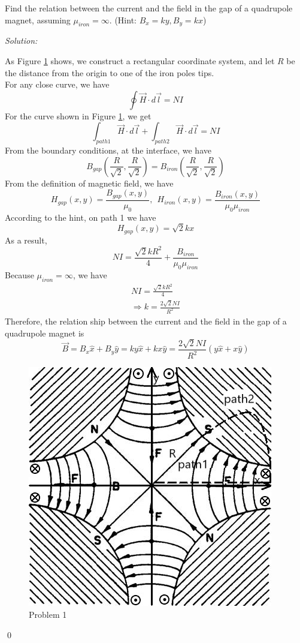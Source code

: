 \documentclass[12pt]{article}
\newenvironment{problem}[2][Problem]{\begin{trivlist}
\item[\hskip \labelsep {\bfseries #1}\hskip \labelsep {\bfseries #2.}]}{\end{trivlist}}
\newenvironment{sol}
    {\emph{Solution:}
    }
    {
    \qed
    }
\begin{document}
\begin{problem}{1}
Find the relation between the current and the field in the gap of a quadrupole magnet, assuming $\mu_{iron}=\infty$. (Hint: $B_x=ky, B_y=kx$)
\end{problem}
\begin{sol}
As Figure \ref{Problem1} shows, we construct a rectangular coordinate system, and let $R$ be the distance from the origin to one of the iron poles tips.\\
For any close curve, we have
\[
\oint\vec{H}\cdot d\vec{l}=NI
\]
For the curve shown in Figure \ref{Problem1}, we get
\[
\int_{path1}\vec{H}\cdot d\vec{l}+\int_{path2}\vec{H}\cdot d\vec{l}=NI
\]
From the boundary conditions, at the interface, we have
\[
B_{gap}(\frac{R}{\sqrt{2}},\frac{R}{\sqrt{2}})=B_{iron}(\frac{R}{\sqrt{2}},\frac{R}{\sqrt{2}})
\]
From the definition of magnetic field, we have
\[
H_{gap}(x,y)=\frac{B_{gap}(x,y)}{\mu_0},~~H_{iron}(x,y)=\frac{B_{iron}(x,y)}{\mu_0\mu_{iron}}
\]
According to the hint, on path 1 we have
\[
H_{gap}(x,y)=\sqrt{2}kx
\]
As a result,
\[
NI=\frac{\sqrt{2}kR^2}{4}+\frac{B_{iron}}{\mu_0\mu_{iron}}
\]
Because $\mu_{iron}=\infty$, we have
\begin{gather*}
NI=\frac{\sqrt{2}kR^2}{4}\\
\Longrightarrow k=\frac{2\sqrt{2}NI}{R^2}
\end{gather*}
Therefore, the relation ship between the current and the field in the gap of a quadrupole magnet is
\[
\vec{B}=B_x\hat{x}+B_y\hat{y}=ky\hat{x}+kx\hat{y}=\frac{2\sqrt{2}NI}{R^2}(y\hat{x}+x\hat{y})
\]
\begin{figure}[h]
\centering
\includegraphics[scale=.7]{Homework_3Problem_1.jpg}
\caption{Problem 1} \label{Problem1}
\end{figure}
\end{sol}
\end{document}
